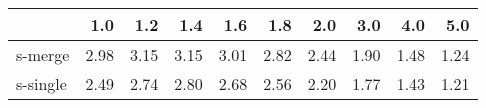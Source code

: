 \begin{tabular}{lrrrrrrrrr}
\toprule
{} &  1.0 &  1.2 &  1.4 &  1.6 &  1.8 &  2.0 &  3.0 &  4.0 &  5.0 \\
\midrule
s-merge  & 2.98 & 3.15 & 3.15 & 3.01 & 2.82 & 2.44 & 1.90 & 1.48 & 1.24 \\
s-single & 2.49 & 2.74 & 2.80 & 2.68 & 2.56 & 2.20 & 1.77 & 1.43 & 1.21 \\
\bottomrule
\end{tabular}
